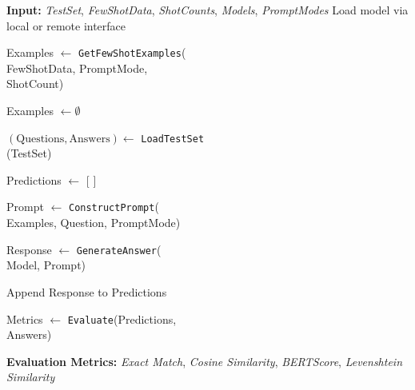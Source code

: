 \documentclass[11pt]{article}
\begin{document}
\begin{algorithm}
\footnotesize
\caption{Evaluate Models on Riddle QA with Few-Shot Prompts}
\label{alg:algorithm}
\begin{algorithmic}[1]
\State \textbf{Input:} \textit{TestSet}, \textit{FewShotData}, \textit{ShotCounts}, \textit{Models}, \textit{PromptModes}
\vspace{0.5em}
    \State Load model via local or remote interface
    \vspace{0.1em}
            \vspace{0.1em}
                \State \parbox[t]{\linewidth}{%
                    Examples $\gets$ \texttt{GetFewShotExamples}(\\
                    FewShotData, PromptMode, \\
                    ShotCount)%
                }
            \Else
                \State Examples $\gets \emptyset$
            \EndIf
            \vspace{0.1em}
            \State \parbox[t]{\linewidth}{%
                $(\text{Questions}, \text{Answers}) \gets$ \texttt{LoadTestSet}\\
                (TestSet)%
            }
            \State Predictions $\gets$ [ ]
            \vspace{0.1em}
                \State \parbox[t]{\linewidth}{%
                    Prompt $\gets$ \texttt{ConstructPrompt}(\\
                    Examples, Question, PromptMode)%
                }
                \State \parbox[t]{\linewidth}{%
                    Response $\gets$ \texttt{GenerateAnswer}(\\
                    Model, Prompt)%
                }
                \State Append Response to Predictions
            \EndFor
            \vspace{0.1em}
            \State \parbox[t]{\linewidth}{%
                Metrics $\gets$ \texttt{Evaluate}(Predictions,\\
                Answers)%
            }
            \vspace{0.5em}
            \State \textbf{Evaluation Metrics:} \textit{Exact Match}, \textit{Cosine Similarity}, \textit{BERTScore}, \textit{Levenshtein Similarity}
        \EndFor
    \EndFor
\EndFor
\end{algorithmic}
\end{algorithm}
\end{document}

